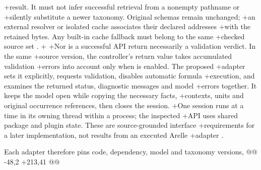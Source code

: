 +result. It must not infer successful retrieval from a nonempty pathname or
+silently substitute a newer taxonomy. Original schemas remain unchanged;
+an external resolver or isolated cache associates their declared addresses
+with the retained bytes. Any built-in cache fallback must belong to the same
+checked source set \citep{arellepinned2026}.
+
+Nor is a successful API return necessarily a validation verdict. In the same
+source version, the controller's return value takes accumulated validation
+errors into account only when  is enabled. The proposed
+adapter sets it explicitly, requests validation, disables automatic formula
+execution, and examines the returned status, diagnostic messages and model
+errors together. It keeps the model open while copying the necessary facts,
+contexts, units and original occurrence references, then closes the session.
+One session runs at a time in its owning thread within a process; the inspected
+API uses shared package and plugin state. These are source-grounded interface
+requirements for a later implementation, not results from an executed Arelle
+adapter \citep{arellepinned2026}.
 
 Each adapter therefore pins code, dependency, model and taxonomy versions,
@@ -48,2 +213,41 @@

